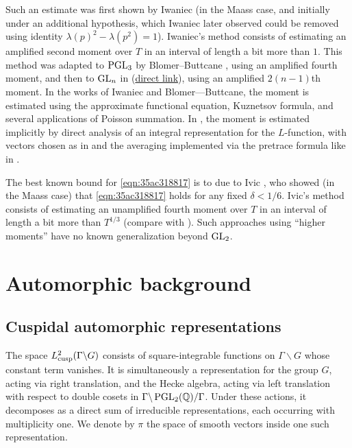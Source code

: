 \documentclass[reqno]{amsart} 
\numberwithin{equation}{section}
\numberwithin{theorem}{section}
\begin{document}
Such an estimate was first shown by Iwaniec \cite{Iwaniec1992} (in the Maass case, and initially under an additional hypothesis, which Iwaniec later observed could be removed using identity $\lambda(p)^2 - \lambda(p^2) = 1$).  Iwaniec's method consists of estimating an amplified second moment over $T$ in an interval of length a bit more than $1$.  This method was adapted to $\operatorname{PGL}_3$ by Blomer--Buttcane \cite{MR4203038, MR4039487}, using an amplified fourth moment, and then to $\operatorname{GL}_n$ in \cite{2021arXiv210915230N}  (\href{standard.pdf}{direct link}), using an amplified $2(n-1)$th moment.  In the works of Iwaniec and Blomer---Buttcane, the moment is estimated using the approximate functional equation, Kuznetsov formula, and several applications of Poisson summation.  In \cite{2021arXiv210915230N}, the moment is estimated implicitly by direct analysis of an integral representation for the $L$-function, with vectors chosen as in \cite{nelson-venkatesh-1} and the averaging implemented via the pretrace formula like in \cite{iwan-sar}.

\begin{remark}
  The best known bound for \eqref{eqn:35ac318817} is to due to Ivic \cite{MR1879668} , who showed (in the Maass case) that \eqref{eqn:35ac318817} holds for any fixed $\delta < 1/6$.  Ivic's method consists of estimating an unamplified fourth moment over $T$ in an interval of length a bit more than $T^{1/3}$ (compare with \cite{michel-2009, Nelson-EisCubic, 2021arXiv210112106B, balkanova2022weyls}).  Such approaches using ``higher moments'' have no known generalization beyond $\operatorname{GL}_2$.
\end{remark}

\section{Automorphic background}\label{sec:35ac3e5876}

\subsection{Cuspidal automorphic representations}\label{sec:35ac3e5878}
The space $L^2_{\operatorname{cusp}}(\Gamma \backslash G)$ consists of square-integrable functions on $\Gamma \backslash G$ whose constant term vanishes.  It is simultaneously a representation for the group $G$, acting via right translation, and the Hecke algebra, acting via left translation with respect to double cosets in $\Gamma \backslash \operatorname{PGL}_2(\mathbb{Q}) / \Gamma$.  Under these actions, it decomposes as a direct sum of irreducible representations, each occurring with multiplicity one.  We denote by $\pi$ the space of smooth vectors inside one such representation.
\end{document}
